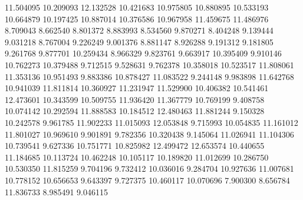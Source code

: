 11.504095
10.209093
12.132528
10.421683
10.975805
10.880895
10.533193
10.664879
10.197425
10.887014
10.376586
10.967958
11.459675
11.486976
8.709043
8.662540
8.801372
8.883993
8.534560
9.870271
8.404248
9.139444
9.031218
8.767004
9.226249
9.001376
8.881147
8.926288
9.191312
9.181805
9.261768
9.877701
10.259434
8.966329
9.823761
9.663917
10.395409
9.910146
10.762273
10.379488
9.712515
9.528631
9.762378
10.358018
10.523517
11.808061
11.353136
10.951493
9.883386
10.878427
11.083522
9.244148
9.983898
11.642768
10.941039
11.811814
10.360927
11.231947
11.529900
10.406382
10.541461
12.473601
10.343599
10.509755
11.936420
11.367779
10.769199
9.408758
10.074142
10.292594
11.888583
10.184512
12.480463
11.881244
9.150328
10.242578
9.961785
11.902233
11.015093
12.053848
9.715993
10.054835
11.161012
11.801027
10.969610
9.901891
9.782356
10.320438
9.145064
11.026941
11.104306
10.739541
9.627336
10.751771
10.825982
12.499472
12.653574
10.440655
11.184685
10.113724
10.462248
10.105117
10.189820
11.012699
10.286750
10.530350
11.815259
9.704196
9.732412
10.036016
9.284704
10.927636
11.007681
10.778152
10.656653
9.643397
9.727375
10.460117
10.070696
7.900300
8.656784
11.836733
8.985491
9.046115

